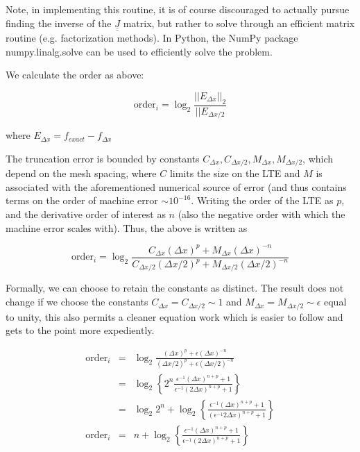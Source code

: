 \documentclass[12pt]{article}
\begin{document}
Note, in implementing this routine, it is of course discouraged to actually pursue finding the inverse of the $\underline{\underline{J}}$ matrix, but rather to solve through an efficient matrix routine (e.g. factorization methods). In Python, the NumPy package numpy.linalg.solve can be used to efficiently solve the problem.



















We calculate the order as above:

$$\text{order}_i = \log_2\frac{||E_{\Delta x}||_2}{||E_{\Delta x/2}}$$

where $E_{\Delta x} = f_{exact} - f_{\Delta x}$

The truncation error is bounded by constants $C_{\Delta x}, C_{\Delta x / 2}, M_{\Delta x}, M_{\Delta x/2}$, which depend on the mesh spacing, where $C$ limits the size on the LTE and $M$ is associated with the aforementioned numerical source of error (and thus contains terms on the order of machine error $\sim 10^{-16}$. Writing the order of the LTE as $p$, and the derivative order of interest as $n$ (also the negative order with which the machine error scales with). Thus, the above is written as

$$\text{order}_i = \log_2\frac{C_{\Delta x}(\Delta x)^{p} + M_{\Delta x}(\Delta x)^{-n}}{C_{\Delta x / 2}(\Delta x / 2)^{p} + M_{\Delta x / 2}(\Delta x / 2)^{-n}}$$

Formally, we can choose to retain the constants as distinct. The result does not change if we choose the constants $C_{\Delta x} = C_{\Delta x/2} \sim 1$ and $M_{\Delta x} = M_{\Delta x / 2} \sim \epsilon$ equal to unity, this also permits a cleaner equation work which is easier to follow and gets to the point more expediently.

\begin{eqnarray*}
\text{order}_i & = &  \log_2\frac{(\Delta x)^{p} + \epsilon (\Delta x)^{-n}}{(\Delta x / 2)^{p} + \epsilon (\Delta x / 2)^{-n}} \\[1em]
& = & \log_2 \left\{ 2^n \frac{\epsilon^{-1}(\Delta x)^{n + p} + 1}{\epsilon^{-1}(2\Delta x)^{n + p} + 1}\right\} \\[1em]
& = & \log_2 2^n + \log_2 \left\{\frac{ \epsilon^{-1}(\Delta x)^{n + p} + 1}{(\epsilon^{-1}2\Delta x)^{n + p} + 1}\right\} \\[1em]
\text{order}_i & = & n + \log_2 \left\{\frac{ \epsilon^{-1}(\Delta x)^{n + p} + 1}{ \epsilon^{-1}(2\Delta x)^{n + p} + 1}\right\} 
\end{eqnarray*}
\end{document}
